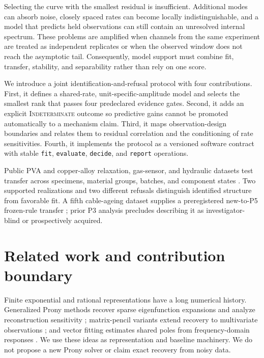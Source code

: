 \documentclass[11pt]{article}
\newcommand{\indet}{\textsc{Indeterminate}}
\begin{document}
Selecting the curve with the smallest residual is insufficient. Additional modes can absorb noise, closely spaced rates can become locally indistinguishable, and a model that predicts held observations can still contain an unresolved internal spectrum. These problems are amplified when channels from the same experiment are treated as independent replicates or when the observed window does not reach the asymptotic tail. Consequently, model support must combine fit, transfer, stability, and separability rather than rely on one score.

We introduce a joint identification-and-refusal protocol with four contributions. First, it defines a shared-rate, unit-specific-amplitude model and selects the smallest rank that passes four predeclared evidence gates. Second, it adds an explicit \indet{} outcome so predictive gains cannot be promoted automatically to a mechanism claim. Third, it maps observation-design boundaries and relates them to residual correlation and the conditioning of rate sensitivities. Fourth, it implements the protocol as a versioned software contract with stable \texttt{fit}, \texttt{evaluate}, \texttt{decide}, and \texttt{report} operations.

Public PVA and copper-alloy relaxation, gas-sensor, and hydraulic datasets test transfer across specimens, material groups, batches, and component states \cite{schelkow2026pva,kupferdigital2024relaxation,ziyatdinov2015dataset,ziyatdinov2015bioinspired,helwig2018hydraulic}. Two supported realizations and two different refusals distinguish identified structure from favorable fit. A fifth cable-ageing dataset supplies a preregistered new-to-P5 frozen-rule transfer \cite{kayanja2026cableageing}; prior P3 analysis precludes describing it as investigator-blind or prospectively acquired.

\section{Related work and contribution boundary}
Finite exponential and rational representations have a long numerical history. Generalized Prony methods recover sparse eigenfunction expansions and analyze reconstruction sensitivity \cite{stampfer2020gop}; matrix-pencil variants extend recovery to multivariate observations \cite{bosner2021parallel}; and vector fitting estimates shared poles from frequency-domain responses \cite{gustavsen1999vector}. We use these ideas as representation and baseline machinery. We do not propose a new Prony solver or claim exact recovery from noisy data.
\end{document}
